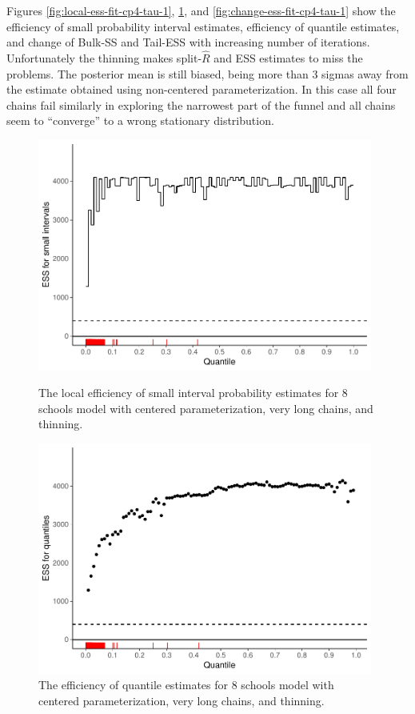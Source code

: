 \documentclass[american,]{article}
\theoremstyle{definition}
\begin{document}
Figures \ref{fig:local-ess-fit-cp4-tau-1},
\ref{fig:quantile-ess-fit-cp4-tau-1}, and
\ref{fig:change-ess-fit-cp4-tau-1} show the efficiency of small
probability interval estimates, efficiency of quantile estimates, and
change of Bulk-SS and Tail-ESS with increasing number of iterations.
Unfortunately the thinning makes split-\(\widehat{R}\) and ESS
estimates to miss the problems. The posterior mean is still biased,
being more than 3 sigmas away from the estimate obtained using
non-centered parameterization. In this case all four chains fail
similarly in exploring the narrowest part of the funnel and all
chains seem to ``converge'' to a wrong stationary distribution.
\begin{figure}[tp]
  \centering
  \begin{minipage}{0.48\textwidth}
  \includegraphics[width=0.98\textwidth]{graphics/local-ess-fit-cp4-tau-1.pdf}
  \caption{The local efficiency of small interval probability estimates for 8 schools model with centered parameterization, very long chains, and thinning.}
  \label{fig:local-ess-fit-cp4-tau-1}
\end{minipage}
\hfill
  \begin{minipage}{0.48\textwidth}
  \includegraphics[width=0.98\textwidth]{graphics/quantile-ess-fit-cp4-tau-1.pdf}
  \caption{The efficiency of quantile estimates for 8 schools model with centered parameterization, very long chains, and thinning.}
  \label{fig:quantile-ess-fit-cp4-tau-1}
\end{minipage}
\end{figure}
\end{document}
